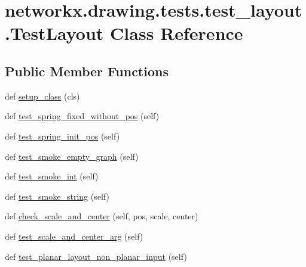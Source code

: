 \hypertarget{classnetworkx_1_1drawing_1_1tests_1_1test__layout_1_1TestLayout}{}\section{networkx.\+drawing.\+tests.\+test\+\_\+layout.\+Test\+Layout Class Reference}
\label{classnetworkx_1_1drawing_1_1tests_1_1test__layout_1_1TestLayout}
\subsection*{Public Member Functions}
\begin{DoxyCompactItemize}
\item 
def \hyperlink{classnetworkx_1_1drawing_1_1tests_1_1test__layout_1_1TestLayout_a7fb72c3cd4a4f4b96dfa9e685e07533f}{setup\+\_\+class} (cls)
\item 
def \hyperlink{classnetworkx_1_1drawing_1_1tests_1_1test__layout_1_1TestLayout_ae9462abeb02bfa412e1eb554b9bc7cda}{test\+\_\+spring\+\_\+fixed\+\_\+without\+\_\+pos} (self)
\item 
def \hyperlink{classnetworkx_1_1drawing_1_1tests_1_1test__layout_1_1TestLayout_aae533f4c8a049bde881f3d522fcf6775}{test\+\_\+spring\+\_\+init\+\_\+pos} (self)
\item 
def \hyperlink{classnetworkx_1_1drawing_1_1tests_1_1test__layout_1_1TestLayout_ae435e53dae5982a3c98ed3522febf15b}{test\+\_\+smoke\+\_\+empty\+\_\+graph} (self)
\item 
def \hyperlink{classnetworkx_1_1drawing_1_1tests_1_1test__layout_1_1TestLayout_a21abc5a05ed2217af25d51daaf1c177a}{test\+\_\+smoke\+\_\+int} (self)
\item 
def \hyperlink{classnetworkx_1_1drawing_1_1tests_1_1test__layout_1_1TestLayout_a9260a831a9e892f2d434c019103f08c8}{test\+\_\+smoke\+\_\+string} (self)
\item 
def \hyperlink{classnetworkx_1_1drawing_1_1tests_1_1test__layout_1_1TestLayout_aae12333b021bd6f3ef90734f0c6d725f}{check\+\_\+scale\+\_\+and\+\_\+center} (self, pos, scale, center)
\item 
def \hyperlink{classnetworkx_1_1drawing_1_1tests_1_1test__layout_1_1TestLayout_a6d661809beccf4e7b32ffab8173cdedd}{test\+\_\+scale\+\_\+and\+\_\+center\+\_\+arg} (self)
\item 
def \hyperlink{classnetworkx_1_1drawing_1_1tests_1_1test__layout_1_1TestLayout_aca2937a7222f525f61a19cf38d66110b}{test\+\_\+planar\+\_\+layout\+\_\+non\+\_\+planar\+\_\+input} (self)

\end{DoxyCompactItemize}
